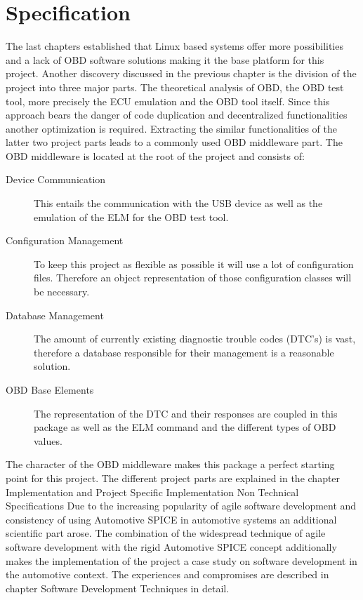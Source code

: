 
\chapter{Specification}
The last chapters established that Linux based systems offer more possibilities and a lack of OBD software solutions making it the base platform for this project. Another discovery discussed in the previous chapter is the division of the project into three major parts. The theoretical analysis of OBD, the OBD test tool, more precisely the ECU emulation and the OBD tool itself. Since this approach bears the danger of code duplication and decentralized functionalities another optimization is required.  Extracting the similar functionalities of the latter two project parts leads to a commonly used OBD middleware part. 
The OBD middleware is located at the root of the project and consists of:
\begin{description}
\item[Device Communication]

This entails the communication with the USB device as well as the emulation of the ELM for the OBD test tool.
\item[Configuration Management]

To keep this project as flexible as possible it will use a lot of configuration files. Therefore an object representation of those configuration classes will be necessary.
\item[Database Management]

The amount of currently existing diagnostic trouble codes (DTC’s) is vast, therefore a database responsible for their management is a reasonable solution.
\item[OBD Base Elements]

The representation of the DTC and their responses are coupled in this package as well as the ELM command and the different types of OBD values.
\end{description}

The character of the OBD middleware makes this package a perfect starting point for this project. 
The different project parts are explained in the chapter Implementation and Project Specific Implementation
Non Technical Specifications
Due to the increasing popularity of agile software development and consistency of using Automotive SPICE in automotive systems an additional scientific part arose. The combination of  the  widespread technique of agile software development with the  rigid Automotive SPICE concept additionally makes the implementation of the project a case study on software development in the automotive context. The experiences and compromises are described in chapter Software Development Techniques  in detail. 

